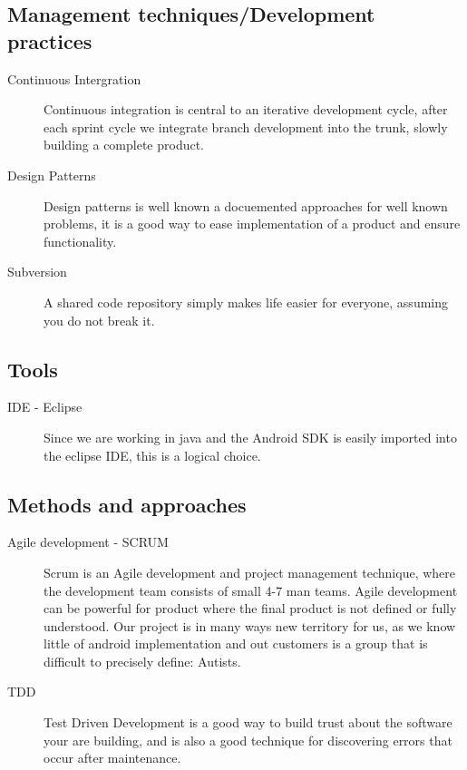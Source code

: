 \subsection*{Management techniques/Development practices}
\begin{description}
 \item [Continuous Intergration] Continuous integration is central to an iterative development cycle, after each sprint cycle we integrate branch development into the trunk, slowly building a complete product.
 \item [Design Patterns] Design patterns is well known a docuemented approaches for well known problems, it is a good way to ease implementation of a product and ensure functionality.
 \item [Subversion] A shared code repository simply makes life easier for everyone, assuming you do not break it.
\end{description}

\subsection*{Tools}
\begin{description}
 \item [IDE - Eclipse] Since we are working in java and the Android SDK is easily imported into the eclipse IDE, this is a logical choice.
\end{description}


\subsection*{Methods and approaches}
\begin{description}
 \item [Agile development - SCRUM] Scrum is an Agile development and project management technique, where the development team consists of small 4-7 man teams. Agile development can be powerful for product where the final
product is not defined or fully understood. Our project is in many ways new territory for us, as we know little of android implementation and out customers is a group that is difficult to precisely define: Autists.
 \item [TDD] Test Driven Development is a good way to build trust about the software your are building, and is also a good technique for discovering errors that occur after maintenance.
\end{description}

